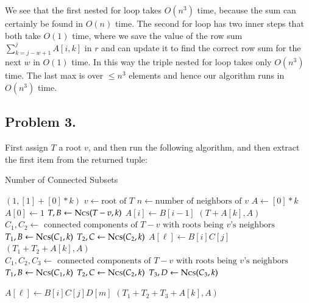 \documentclass[12pt]{article}
\theoremstyle{definitionstyle}
\begin{document}
    We see that the first nested for loop takes $O(n^3)$ time, because the sum can certainly be found in $O(n)$ time. The second for loop has two inner steps that both take $O(1)$ time, where we save the value of the row sum $\sum_{k=j-w+1}^j A[i,k]$ in $r$ and can update it to find the correct row sum for the next $w$ in $O(1)$ time. In this way the triple nested for loop takes only $O(n^3)$ time. The last max is over $\leq n^3$ elements and hence our algorithm runs in $O(n^3)$ time.

    \subsection*{Problem 3.}
    First assign $T$ a root $v$, and then run the following algorithm, and then extract the first item from the returned tuple:

    \newpage


    \begin{algorithm}
        \caption{Number of Connected Subsets}
        \begin{algorithmic}
                \State \Return $(1, [1] + [0] * k)$
            \EndIf
            \State $v \gets \text{root of } T$
            \State $n \gets \text{number of neighbors of } v$
            \State $A \gets [0] * k$
            \State $A[0] \gets 1$
                \State $T, B \gets \Call{Ncs}{T-v, k}$
                    \State $A[i] \gets B[i-1]$
                \EndFor
                \State \Return $(T+A[k], A)$
            \EndIf
            \EndProcedure
                \State $C_1, C_2 \gets \text{ connected components of } T-v \text{ with roots being $v$'s neighbors}$
                \State $T_1, B \gets \Call{Ncs}{C_1, k}$
                \State $T_2, C \gets \Call{Ncs}{C_2, k}$
                        \State $A[\ell] \gets B[i]C[j]$
                    \EndFor
                \EndFor
                \State \Return $(T_1+T_2+A[k], A)$
            \EndIf
            \State $C_1, C_2, C_3 \gets \text{ connected components of } T-v \text{ with roots being $v$'s neighbors}$
            \State $T_1, B \gets \Call{Ncs}{C_1, k}$
            \State $T_2, C \gets \Call{Ncs}{C_2, k}$
            \State $T_3, D \gets \Call{Ncs}{C_3, k}$
                        
                        \State $A[\ell] \gets B[i]C[j]D[m]$
                    \EndFor
                \EndFor
                \State \Return $(T_1+T_2+T_3+A[k], A)$
            \EndIf
        \end{algorithmic}
    \end{algorithm}
\end{document}
